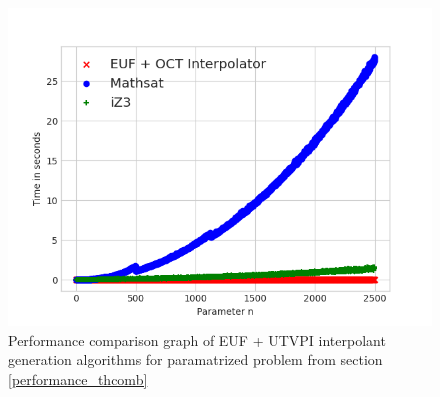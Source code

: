 \begin{figure}
  \centering
  \includegraphics[scale=0.9]{figures/thci_performance_graph_large}
  \caption{Performance comparison graph of EUF + UTVPI 
    interpolant generation
    algorithms for paramatrized problem from section 
  \ref{performance_thcomb}} 
  \label{performance_graph_thcomb}
\end{figure}


